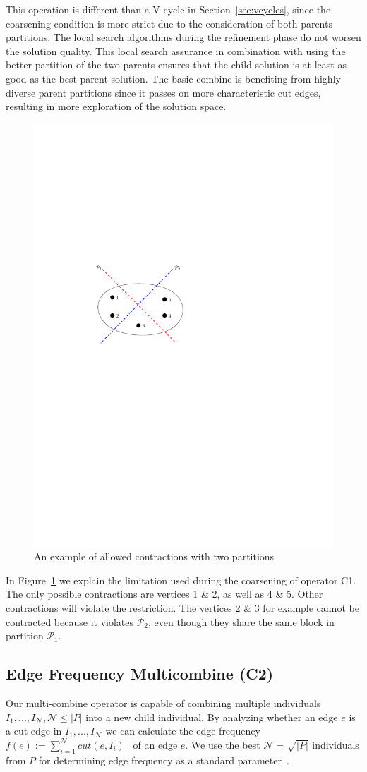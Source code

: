 \documentclass[a4paper,12pt,titlepage, BCOR7mm,headsepline]{scrbook}
\numberwithin{equation}{section}
\begin{document}
This operation is different than a V-cycle in Section~\ref{sec:vcycles}, since the coarsening condition is more strict due to the consideration of both parents partitions. The local search algorithms during the refinement phase do not worsen the solution quality.
This local search assurance in combination with using the better partition of the two parents ensures that the child solution is at least as good as the best parent solution. \label{qualityassurance} The basic combine is benefiting from highly diverse parent partitions since it passes on more characteristic cut edges, resulting in more exploration of the solution space. %

\begin{figure}[H] 

  \begin{center}
   \includegraphics[width=.5\textwidth]{Ipe/parent_combine.pdf}
  \caption{An example of allowed contractions with two partitions}
  \label{fig:parent_combine}
  \end{center}

\end{figure}
In Figure~\ref{fig:parent_combine} we explain the limitation used during the coarsening of operator C1. The only possible contractions are vertices 1 \& 2, as well as 4 \& 5. Other contractions will violate the restriction. The vertices 2 \& 3 for example cannot be contracted because it violates $\mathcal{P}_2$, even though they share the same block in partition $\mathcal{P}_1$. 
\subsection{Edge Frequency Multicombine (C2)}
\label{sec:edgefrequency}
Our multi-combine operator is capable of combining multiple individuals $I_1,...,I_{\mathcal{N}}, \mathcal{N} \le |P|$ into a new child individual. By analyzing whether an edge $e$ is a cut edge in $I_1,...,I_{\mathcal{N}}$ we can calculate the edge frequency $f(e) := \sum_{i=1}^{\mathcal{N}} cut(e,I_i)$~\cite{wichlund1998multilevel} of an edge $e$. We use the best $\mathcal{N} = \sqrt{|P|}$ individuals from $P$ for determining edge frequency as a standard parameter~\cite{delling2011graph}. 
\end{document}
